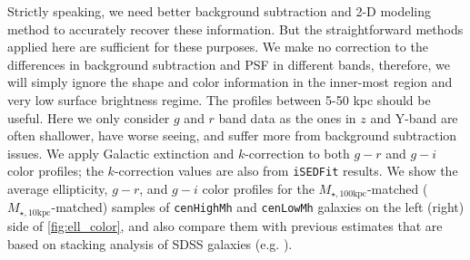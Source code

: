 \documentclass{emulateapj}
\def\rbcg{\texttt{cenHighMh}}
\def\nbcg{\texttt{cenLowMh}}
\def\minn{{$M_{\star,10\mathrm{kpc}}$}}
\def\mtot{{$M_{\star,100\mathrm{kpc}}$}}
\newcommand{\update}[1]{\textcolor{Bittersweet}{#1}}
\begin{document}
\begin{CJK*}{UTF8}{gbsn}
    \update{
    Strictly speaking, we need better background subtraction and 2-D modeling method 
    to accurately recover these information. 
    But the straightforward methods applied here are sufficient for these purposes. 
    We make no correction to the differences in background subtraction and PSF in 
    different bands, therefore, we will simply ignore the shape and color information 
    in the inner-most region and very low surface brightness regime. 
    The profiles between 5-50 kpc should be useful. 
    Here we only consider $g$ and $r$ band data as the ones in $z$ and Y-band are 
    often shallower, have worse seeing, and suffer more from background subtraction 
    issues. 
    We apply Galactic extinction and $k$-correction to both $g-r$ and $g-i$ color 
    profiles; the $k$-correction values are also from \texttt{iSEDFit} results.
    We show the average ellipticity, $g-r$, and $g-i$ color profiles for the 
    \mtot{}-matched (\minn{}-matched) samples of \rbcg{} and \nbcg{} galaxies on the 
    left (right) side of \ref{fig:ell_color}, and also compare them with previous 
    estimates that are based on stacking analysis of SDSS galaxies 
    (e.g. \citealt{LaBarbera2010, Tal2011, DSouza2014}).}
    

\end{CJK*}
\end{document}
